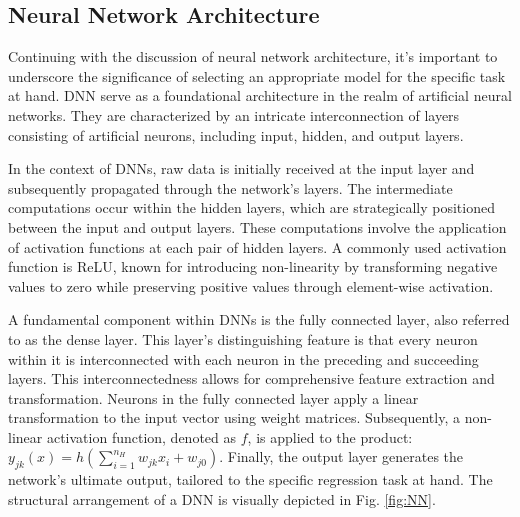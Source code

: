 \subsection{Neural Network Architecture}
Continuing with the discussion of neural network architecture, it's important to underscore the significance of selecting an appropriate model for the specific task at hand. \ac{DNN} serve as a foundational architecture in the realm of artificial neural networks. They are characterized by an intricate interconnection of layers consisting of artificial neurons, including input, hidden, and output layers.

In the context of DNNs, raw data is initially received at the input layer and subsequently propagated through the network's layers. The intermediate computations occur within the hidden layers, which are strategically positioned between the input and output layers. These computations involve the application of activation functions at each pair of hidden layers. A commonly used activation function is \ac{ReLU}, known for introducing non-linearity by transforming negative values to zero while preserving positive values through element-wise activation. 

A fundamental component within DNNs is the fully connected layer, also referred to as the dense layer. This layer's distinguishing feature is that every neuron within it is interconnected with each neuron in the preceding and succeeding layers. This interconnectedness allows for comprehensive feature extraction and transformation. Neurons in the fully connected layer apply a linear transformation to the input vector using weight matrices. Subsequently, a non-linear activation function, denoted as $f$, is applied to the product: $y_{jk}(x)=h\left(\sum_{i=1}^{n_H} w_{j k} x_i+w_{j0}\right)$. Finally, the output layer generates the network's ultimate output, tailored to the specific regression task at hand. The structural arrangement of a DNN is visually depicted in Fig. \ref{fig:NN}.



